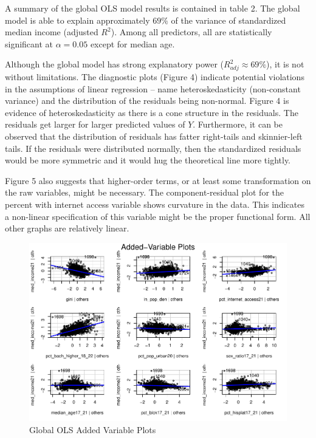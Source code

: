 \documentclass[
]{article}
\begin{document}
A summary of the global OLS model results is contained in table 2. The
global model is able to explain approximately \(69\%\) of the variance
of standardized median income (adjusted \(R^{2}\)). Among all
predictors, all are statistically significant at \(\alpha = 0.05\)
except for median age.

Although the global model has strong explanatory power
(\(R_{adj}^{2} \approx 69\%\)), it is not without limitations. The
diagnostic plots (Figure 4) indicate potential violations in the
assumptions of linear regression -- name heteroskedasticity
(non-constant variance) and the distribution of the residuals being
non-normal. Figure 4 is evidence of heteroskedasticity as there is a
cone structure in the residuals. The residuals get larger for larger
predicted values of \(Y\). Furthermore, it can be observed that the
distribution of residuals has fatter right-tails and skinnier-left
tails. If the residuals were distributed normally, then the standardized
residuals would be more symmetric and it would hug the theoretical line
more tightly.

Figure 5 also suggests that higher-order terms, or at least some
transformation on the raw variables, might be necessary. The
component-residual plot for the percent with internet access variable
shows curvature in the data. This indicates a non-linear specification
of this variable might be the proper functional form. All other graphs
are relatively linear.

\begin{figure}[H]

{\centering \includegraphics[width=1\linewidth]{final-project-write-up-nathan-nguyen_files/figure-latex/unnamed-chunk-6-1} 

}

\caption{Global OLS Added Variable Plots}\label{fig:unnamed-chunk-6}
\end{figure}
\end{document}
